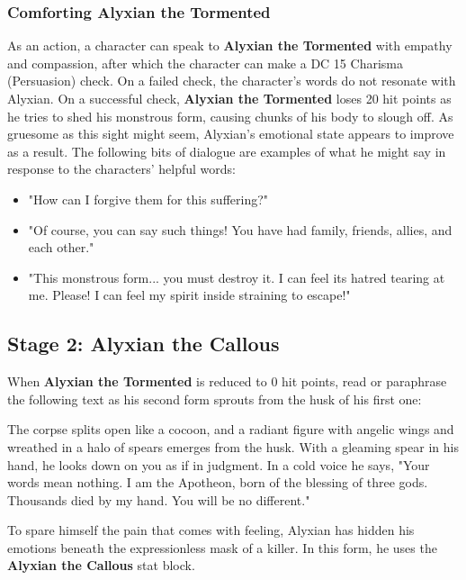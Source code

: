 \documentclass[10pt,a4,twoside,twocolumn,openany,nodeprecatedcode]{dndbook}
\begin{document}
\subsubsection{Comforting Alyxian the Tormented}
As an action, a character can speak to \textbf{Alyxian the Tormented} with empathy and compassion, after which the character can make a DC 15 Charisma (Persuasion) check. On a failed check, the character's words do not resonate with Alyxian. On a successful check, \textbf{Alyxian the Tormented} loses 20 hit points as he tries to shed his monstrous form, causing chunks of his body to slough off. As gruesome as this sight might seem, Alyxian's emotional state appears to improve as a result. The following bits of dialogue are examples of what he might say in response to the characters' helpful words:
\begin{itemize}

\item "How can I forgive them for this suffering?"
\item "Of course, you can say such things! You have had family, friends, allies, and each other."
\item "This monstrous form... you must destroy it. I can feel its hatred tearing at me. Please! I can feel my spirit inside straining to escape!"
\end{itemize}


\subsection{Stage 2: Alyxian the Callous}
When \textbf{Alyxian the Tormented} is reduced to 0 hit points, read or paraphrase the following text as his second form sprouts from the husk of his first one:
\begin{DndReadAloud}{}
The corpse splits open like a cocoon, and a radiant figure with angelic wings and wreathed in a halo of spears emerges from the husk. With a gleaming spear in his hand, he looks down on you as if in judgment. In a cold voice he says, "Your words mean nothing. I am the Apotheon, born of the blessing of three gods. Thousands died by my hand. You will be no different."
\end{DndReadAloud}

To spare himself the pain that comes with feeling, Alyxian has hidden his emotions beneath the expressionless mask of a killer. In this form, he uses the \textbf{Alyxian the Callous} stat block.
\end{document}
